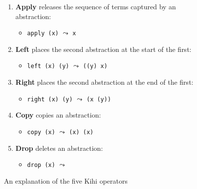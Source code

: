 \begin{figure}[htb]
    \renewcommand{\labelitemi}{$\textendash$}
    \begin{enumerate}
        \item \textbf{Apply} releases the sequence of terms captured by an abstraction:
        \begin{itemize}
            \item \lstinline{apply (x)} $\leadsto$ \lstinline{x}
        \end{itemize}

        \item \textbf{Left} places the second abstraction at the start of the first:
        \begin{itemize}
            \item \lstinline{left (x) (y)} $\leadsto$ \lstinline{((y) x)}
        \end{itemize}

        \item \textbf{Right} places the second abstraction at the end of the first:
        \begin{itemize}
            \item \lstinline{right (x) (y)} $\leadsto$ \lstinline{(x (y))}
        \end{itemize}

        \item \textbf{Copy} copies an abstraction:
        \begin{itemize}
            \item \lstinline{copy (x)} $\leadsto$ \lstinline{(x) (x)}
        \end{itemize}

        \item \textbf{Drop} deletes an abstraction:
        \begin{itemize}
            \item \lstinline{drop (x)} $\leadsto$ \lstinline{}
        \end{itemize}
    \end{enumerate}
    \caption{An explanation of the five Kihi operators}
    \label{fig:operator_explanation}
\end{figure}